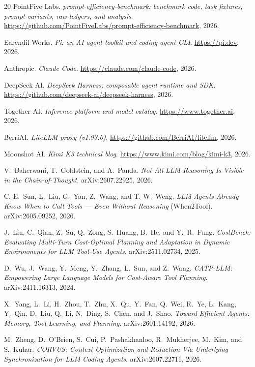 \documentclass[11pt]{article}
\begin{document}
\begin{thebibliography}{20}
PointFive Labs. \emph{prompt-efficiency-benchmark: benchmark code, task fixtures,
prompt variants, raw ledgers, and analysis}.
\url{https://github.com/PointFiveLabs/prompt-efficiency-benchmark}, 2026.

Earendil Works. \emph{Pi: an AI agent toolkit and coding-agent CLI}.
\url{https://pi.dev}, 2026.

Anthropic. \emph{Claude Code}. \url{https://claude.com/claude-code}, 2026.

DeepSeek AI. \emph{DeepSeek Harness: composable agent runtime and SDK}.
\url{https://github.com/deepseek-ai/deepseek-harness}, 2026.

Together AI. \emph{Inference platform and model catalog}.
\url{https://www.together.ai}, 2026.

BerriAI. \emph{LiteLLM proxy (v1.93.0)}.
\url{https://github.com/BerriAI/litellm}, 2026.

Moonshot AI. \emph{Kimi K3 technical blog}.
\url{https://www.kimi.com/blog/kimi-k3}, 2026.

V.~Baherwani, T.~Goldstein, and A.~Panda.
\emph{Not All LLM Reasoning Is Visible in the Chain-of-Thought}.
arXiv:2607.22925, 2026.

C.-E.~Sun, L.~Liu, G.~Yan, Z.~Wang, and T.-W.~Weng.
\emph{LLM Agents Already Know When to Call Tools --- Even Without
Reasoning} (When2Tool). arXiv:2605.09252, 2026.

J.~Liu, C.~Qian, Z.~Su, Q.~Zong, S.~Huang, B.~He, and Y.~R.~Fung.
\emph{CostBench: Evaluating Multi-Turn Cost-Optimal Planning and
Adaptation in Dynamic Environments for LLM Tool-Use Agents}.
arXiv:2511.02734, 2025.

D.~Wu, J.~Wang, Y.~Meng, Y.~Zhang, L.~Sun, and Z.~Wang.
\emph{CATP-LLM: Empowering Large Language Models for Cost-Aware Tool
Planning}. arXiv:2411.16313, 2024.

X.~Yang, L.~Li, H.~Zhou, T.~Zhu, X.~Qu, Y.~Fan, Q.~Wei, R.~Ye, L.~Kang,
Y.~Qin, D.~Liu, Q.~Li, N.~Ding, S.~Chen, and J.~Shao.
\emph{Toward Efficient Agents: Memory, Tool Learning, and Planning}.
arXiv:2601.14192, 2026.

M.~Zheng, D.~O'Brien, S.~Cui, P.~Pashakhanloo, R.~Mukherjee, M.~Kim, and
S.~Kuhar.
\emph{CORVUS: Context Optimization and Reduction Via Underlying
Synchronization for LLM Coding Agents}. arXiv:2607.22711, 2026.
\end{thebibliography}
\end{document}
